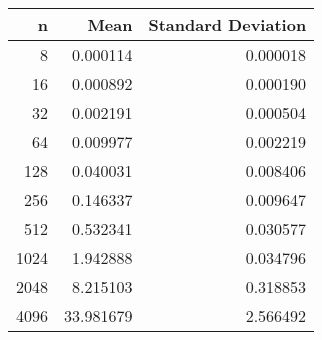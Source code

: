 \begin{tabular}{rrr}
\toprule
    n &       Mean &  Standard Deviation \\
\midrule
    8 &   0.000114 &            0.000018 \\
   16 &   0.000892 &            0.000190 \\
   32 &   0.002191 &            0.000504 \\
   64 &   0.009977 &            0.002219 \\
  128 &   0.040031 &            0.008406 \\
  256 &   0.146337 &            0.009647 \\
  512 &   0.532341 &            0.030577 \\
 1024 &   1.942888 &            0.034796 \\
 2048 &   8.215103 &            0.318853 \\
 4096 &  33.981679 &            2.566492 \\
\bottomrule
\end{tabular}
